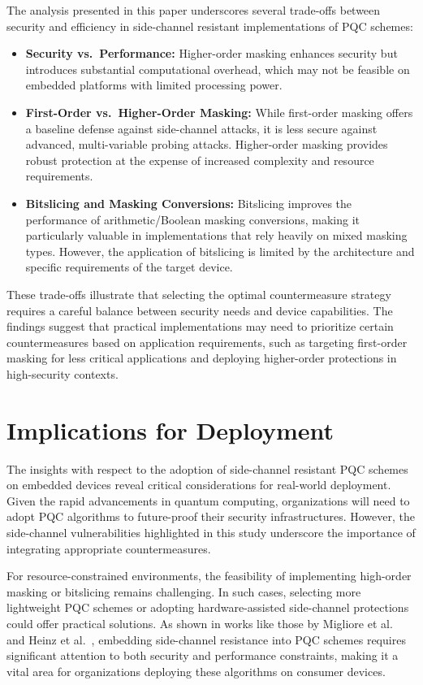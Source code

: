 The analysis presented in this paper underscores several trade-offs between security and efficiency in side-channel resistant implementations of \ac{PQC} schemes:
\begin{itemize}
    \item \textbf{Security vs.\ Performance:} Higher-order masking enhances security but introduces substantial computational overhead, which may not be feasible on embedded platforms with limited processing power.
    \item \textbf{First-Order vs.\ Higher-Order Masking:} While first-order masking offers a baseline defense against side-channel attacks, it is less secure against advanced, multi-variable probing attacks. Higher-order masking provides robust protection at the expense of increased complexity and resource requirements.
    \item \textbf{Bitslicing and Masking Conversions:} Bitslicing improves the performance of arithmetic/Boolean masking conversions, making it particularly valuable in implementations that rely heavily on mixed masking types. However, the application of bitslicing is limited by the architecture and specific requirements of the target device.
\end{itemize}

These trade-offs illustrate that selecting the optimal countermeasure strategy requires a careful balance between security needs and device capabilities. The findings suggest that practical implementations may need to prioritize certain countermeasures based on application requirements, such as targeting first-order masking for less critical applications and deploying higher-order protections in high-security contexts.

\section{Implications for Deployment}

The insights with respect to the adoption of side-channel resistant \ac{PQC} schemes on embedded devices reveal critical considerations for real-world deployment. Given the rapid advancements in quantum computing, organizations will need to adopt \ac{PQC} algorithms to future-proof their security infrastructures. However, the side-channel vulnerabilities highlighted in this study underscore the importance of integrating appropriate countermeasures.

For resource-constrained environments, the feasibility of implementing high-order masking or bitslicing remains challenging. In such cases, selecting more lightweight \ac{PQC} schemes or adopting hardware-assisted side-channel protections could offer practical solutions. As shown in works like those by Migliore et al.\ \cite{Migliore19} and Heinz et al.\ \cite{Heinz20}, embedding side-channel resistance into \ac{PQC} schemes requires significant attention to both security and performance constraints, making it a vital area for organizations deploying these algorithms on consumer devices.

